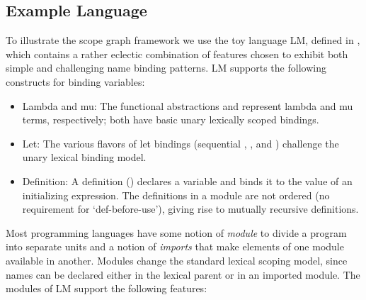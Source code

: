 \subsection{Example Language}


%

To illustrate the scope graph framework we use the toy language LM, defined in
, which contains a 
rather eclectic combination of features chosen to 
exhibit both simple and challenging name binding patterns.
LM supports the following constructs for binding variables:

\begin{itemize}
  \item Lambda and mu: The functional abstractions  and 
  represent lambda and mu terms, respectively; both have basic unary 
  lexically scoped bindings.
  \item Let: The various flavors of let bindings (sequential ,
  , and ) challenge the unary lexical binding
  model.
  \item Definition: A definition () declares a variable and binds
  it to the value of an initializing expression. The definitions in a module are
  not ordered (no requirement for `def-before-use'), giving rise to mutually recursive
  definitions.
\end{itemize}

Most programming languages have some notion of \emph{module} to divide a
program into separate units and a notion of \emph{imports} that make
elements of one module available in another. Modules change the standard lexical
scoping model, since names can be declared either in the lexical parent or in an
imported module. The modules of LM support the following features:


